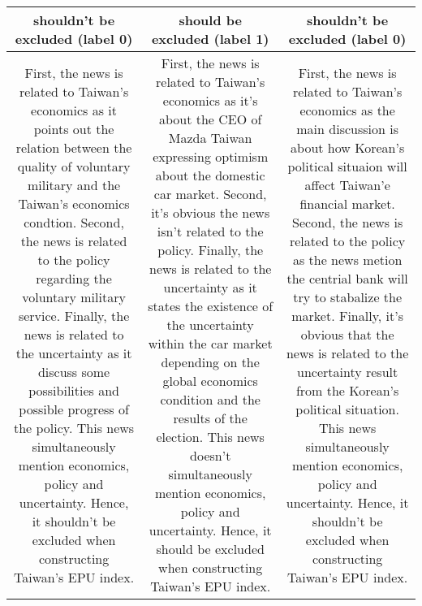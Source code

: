 {\begin{tabularx}{\textwidth}{|C|C|C|}
\textbf{shouldn't be excluded (label 0)} & 
\textbf{should be excluded (label 1)} &
\textbf{shouldn't be excluded (label 0)}\\
\hline
First, the news is related to Taiwan's economics as it points out the relation between the quality of voluntary military and the Taiwan's economics condtion. Second, the news is related to the policy regarding the voluntary military service. Finally, the news is related to the uncertainty as it discuss some possibilities and possible progress of the policy. This news simultaneously mention economics, policy and uncertainty. Hence, it shouldn't be excluded when constructing Taiwan's EPU index.
&
First, the news is related to Taiwan's economics as it's about the CEO of Mazda Taiwan expressing optimism about the domestic car market. Second, it's obvious the news isn't related to the policy. Finally, the news is related to the uncertainty as it states the existence of the uncertainty within the car market depending on the  global economics condition and the results of the election. This news doesn't simultaneously mention economics, policy and uncertainty. Hence, it should be excluded when constructing Taiwan's EPU index.
&
First, the news is related to Taiwan's economics as the main discussion is about how Korean's political situaion will affect Taiwan'e financial market. Second, the news is related to the policy as the news metion the centrial bank will try to stabalize the market. Finally, it's obvious that the news is related to the uncertainty result from the Korean's political situation. This news simultaneously mention economics, policy and uncertainty. Hence, it shouldn't be excluded when constructing Taiwan's EPU index.
\\
\hline
\end{tabularx}
}